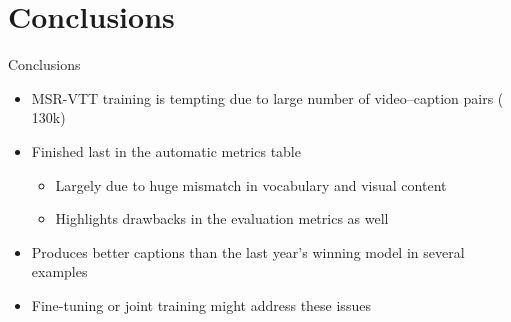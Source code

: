 \documentclass{beamer}
\newcommand{\mcCell}[1]{\multicolumn{1}{|c|}{#1}}
\begin{document}
\section{Conclusions}
\begin{frame}{Conclusions}
\begin{itemize}
    \item MSR-VTT training is tempting due to large number of video--caption pairs (~ 130k)
    \item Finished last in the automatic metrics table 
       \begin{itemize}
           \item Largely due to huge mismatch in vocabulary and visual content
           \item Highlights drawbacks in the evaluation metrics as well
       \end{itemize}
    \item Produces better captions than the last year's winning model in several examples
    \item Fine-tuning or joint training might address these issues
\end{itemize}
\end{frame}
\end{document}
